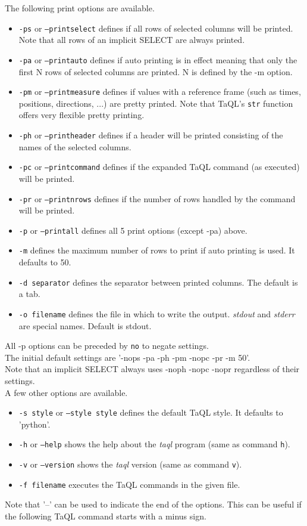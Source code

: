   The following print options are available.
  \begin{itemize}
  \item \texttt{-ps} or \texttt{--printselect} defines if all rows
    of selected columns will be printed. Note that all rows of an
    implicit SELECT are always printed.
  \item \texttt{-pa} or \texttt{--printauto} defines if auto printing
    is in effect meaning that only the first N rows of selected
    columns are printed. N is defined by the -m option.
  \item \texttt{-pm} or \texttt{--printmeasure} defines if values with
    a reference frame (such as times, positions, directions, ...) are
    pretty printed. Note that TaQL's \texttt{str} function offers very
    flexible pretty printing.
  \item \texttt{-ph} or \texttt{--printheader} defines if a header
    will be printed consisting of the names of the selected columns.
  \item \texttt{-pc} or \texttt{--printcommand} defines if the
    expanded TaQL command (as executed) will be printed.
  \item \texttt{-pr} or \texttt{--printnrows} defines if the number of
    rows handled by the command will be printed.
  \item \texttt{-p} or \texttt{--printall} defines all 5 print options
    (except -pa) above.
  \item \texttt{-m} defines the maximum number of rows to print if
    auto printing is used. It defaults to 50.
  \item \texttt{-d separator} defines the separator between printed
    columns. The default is a tab.
  \item \texttt{-o filename} defines the file in which to write the
    output. {\em stdout} and {\em stderr} are special
    names. Default is stdout.
  \end{itemize}
  All -p options can be preceded by \texttt{no} to negate settings.
  \\The initial default settings are '-nops -pa -ph -pm -nopc -pr -m 50'.
  \\Note that an implicit SELECT always uses -noph -nopc -nopr
  regardless of their settings.
  \\A few other options are available.
  \begin{itemize}
  \item \texttt{-s style} or \texttt{--style style} defines the
    default TaQL style. It defaults to 'python'.
  \item \texttt{-h} or \texttt{--help} shows the help about the {\em
      taql} program (same as command \texttt{h}).
  \item \texttt{-v} or \texttt{--version} shows the {\em taql}
    version (same as command \texttt{v}). 
    \item \texttt{-f filename} executes the TaQL commands in the given file.
  \end{itemize}
  Note that '--' can be used to indicate the end of the
  options. This can be useful if the following TaQL command starts with
  a minus sign.


